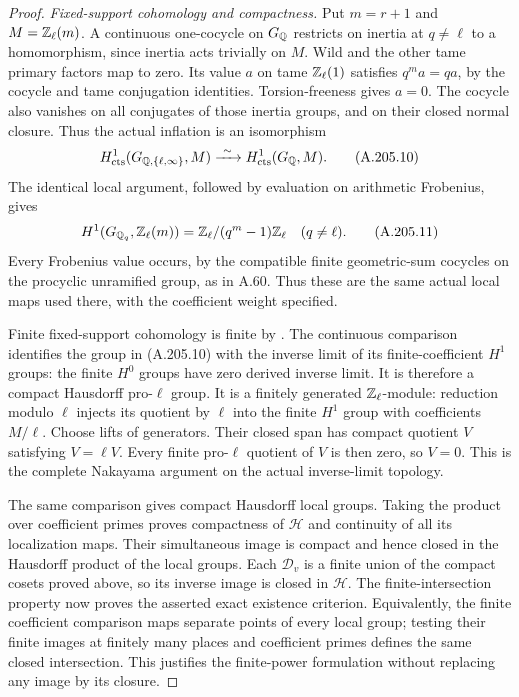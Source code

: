 \begin{proof}
\emph{Fixed-support cohomology and compactness.}
Put \(m=r+1\) and \(M=\mathbb Z_\ell(m)\).  A continuous
one-cocycle on \(G_\mathbb Q\) restricts on inertia at
\(q\ne\ell\) to a homomorphism, since inertia acts
trivially on \(M\).  Wild and the other tame primary
factors map to zero.  Its value \(a\) on tame
\(\mathbb Z_\ell(1)\) satisfies
\(q^m a=q a\), by the cocycle and tame conjugation
identities.  Torsion-freeness gives \(a=0\).
The cocycle also vanishes on all conjugates of those
inertia groups, and on their closed normal closure.
Thus the actual inflation is an isomorphism
\[
 H^1_{\rm cts}(G_{\mathbb Q,\{\ell,\infty\}},M)
          \xrightarrow{\ \sim\ }H^1_{\rm cts}(G_\mathbb Q,M).
\tag{A.205.10}
\]
The identical local argument, followed by evaluation on
arithmetic Frobenius, gives
\[
 H^1(G_{\mathbb Q_q},\mathbb Z_\ell(m))
          =\mathbb Z_\ell/(q^m-1)\mathbb Z_\ell\quad(q\ne\ell).
\tag{A.205.11}
\]
Every Frobenius value occurs, by the compatible finite
geometric-sum cocycles on the procyclic unramified group,
as in A.60.  Thus these are the same actual local maps
used there, with the coefficient weight specified.

Finite fixed-support cohomology is finite by
\cite[I, Corollary 4.15]{BIR_MilneADT}.
The continuous comparison
\cite[(1.6), Theorem 2.2]{BIR_Jannsen1988} identifies
the group in (A.205.10) with the inverse limit of its
finite-coefficient \(H^1\) groups: the finite \(H^0\)
groups have zero derived inverse limit.  It is therefore
a compact Hausdorff pro-\(\ell\) group.
It is a finitely generated \(\mathbb Z_\ell\)-module: reduction
modulo \(\ell\) injects its quotient by \(\ell\) into
the finite \(H^1\) group with coefficients \(M/\ell\).
Choose lifts of generators.  Their closed span has
compact quotient \(V\) satisfying \(V=\ell V\).
Every finite pro-\(\ell\) quotient of \(V\) is then
zero, so \(V=0\).  This is the complete Nakayama argument
on the actual inverse-limit topology.

The same comparison gives compact Hausdorff local groups.
Taking the product over coefficient primes proves compactness
of \(\mathcal H\) and continuity of all its localization
maps.  Their simultaneous image is compact and hence closed
in the Hausdorff product of the local groups.  Each
\(\mathcal D_v\) is a finite union of the compact cosets
proved above, so its inverse image is closed in
\(\mathcal H\).  The finite-intersection property now
proves the asserted exact existence criterion.
Equivalently, the finite coefficient comparison maps
separate points of every local group; testing their finite
images at finitely many places and coefficient primes
defines the same closed intersection.  This justifies the
finite-power formulation without replacing any image by
its closure.


\end{proof}
